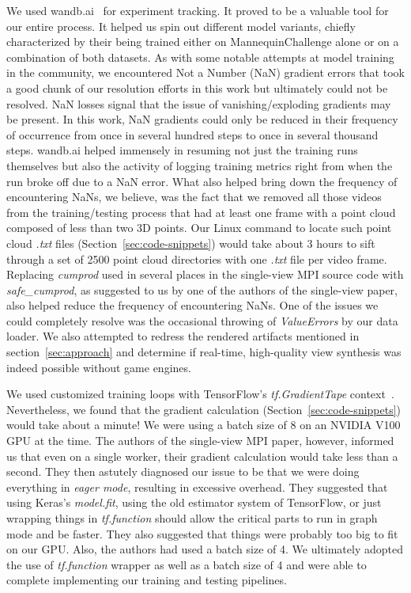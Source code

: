 We used wandb.ai~\cite{wandb} for experiment tracking. It proved to be a valuable tool for our entire process. It helped us spin out different model variants, chiefly characterized by their being trained either on MannequinChallenge alone or on a combination of both datasets. As with some notable attempts at model training in the community, we encountered Not a Number (NaN) gradient errors that took a good chunk of our resolution efforts in this work but ultimately could not be resolved. NaN losses signal that the issue of vanishing/exploding gradients may be present. In this work, NaN gradients could only be reduced in their frequency of occurrence from once in several hundred steps to once in several thousand steps. wandb.ai helped immensely in resuming not just the training runs themselves but also the activity of logging training metrics right from when the run broke off due to a NaN error. What also helped bring down the frequency of encountering NaNs, we believe, was the fact that we removed all those videos from the training/testing process that had at least one frame with a point cloud composed of less than two 3D points. Our Linux command to locate such point cloud \textit{.txt} files (Section~\ref{sec:code-snippets}) would take about 3 hours to sift through a set of 2500 point cloud directories with one \textit{.txt} file per video frame. Replacing \textit{cumprod} used in several places in the single-view MPI source code with \textit{safe\_cumprod}, as suggested to us by one of the authors of the single-view paper, also helped reduce the frequency of encountering NaNs. One of the issues we could completely resolve was the occasional throwing of \textit{ValueErrors} by our data loader. We also attempted to redress the rendered artifacts mentioned in section~\ref{sec:approach} and determine if real-time, high-quality view synthesis was indeed possible without game engines.

We used customized training loops with TensorFlow's \textit{tf.GradientTape} context~\cite{noauthor_custom_nodate}. Nevertheless, we found that the gradient calculation (Section~\ref{sec:code-snippets}) would take about a minute! We were using a batch size of 8 on an NVIDIA V100 GPU at the time. The authors of the single-view MPI paper, however, informed us that even on a single worker, their gradient calculation would take less than a second. They then astutely diagnosed our issue to be that we were doing everything in \textit{eager mode}, resulting in excessive overhead. They suggested that using Keras's \textit{model.fit}, using the old estimator system of TensorFlow, or just wrapping things in \textit{tf.function} should allow the critical parts to run in graph mode and be faster. They also suggested that things were probably too big to fit on our GPU. Also, the authors had used a batch size of 4. We ultimately adopted the use of \textit{tf.function} wrapper as well as a batch size of 4 and were able to complete implementing our training and testing pipelines.

